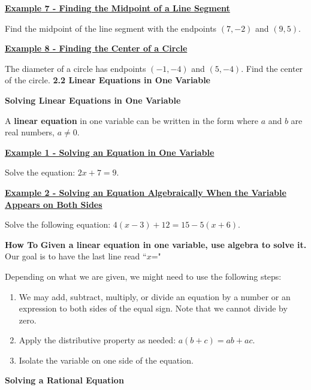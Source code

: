 \documentclass[12pt]{book}
\newcommand{\D}{\displaystyle}
\begin{document}
\newpage


\underline{\textbf{Example 7 - Finding the Midpoint of a Line Segment}}

Find the midpoint of the line segment with the endpoints $(7, -2)$ and $(9,5)$.


\vspace{70mm}
\underline{\textbf{Example 8 - Finding the Center of a Circle}}

The diameter of a circle has endpoints $(-1,-4)$ and $(5,-4)$. Find the center of the circle. 
\newpage
\textbf{{\Large 2.2 Linear Equations in One Variable}}
\vspace{5mm}


{\large \textbf{Solving Linear Equations in One Variable}}
\vspace{3mm}

A \textbf{linear equation} in one variable can be written in the form \underline{\hspace{25mm}} where $a$ and $b$ are real numbers, $a \neq 0$. 

\vspace{3mm}

\underline{\textbf{Example 1 - Solving an Equation in One Variable}}

\vspace{1mm}
Solve the equation: $\D 2x+7 = 9$.

\vspace{60mm}
\underline{\textbf{Example 2 - Solving an Equation Algebraically When the Variable Appears on Both Sides}}

\vspace{1mm}
Solve the following equation: $\D 4(x-3) + 12 = 15-5(x+6)$.


\newpage

\begin{boxR}
    \textbf{How To}
    \vspace{1mm}
    \hline
      \vspace{2mm}
   \textbf{Given a linear equation in one variable, use algebra to solve it.} Our goal is to have the last line read ``$x$\hspace{1mm}=\hspace{1mm}\underline{\hspace{10mm}}"

Depending on what we are given, we might need to use the following steps:
    \begin{enumerate}
     \item We may add, subtract, multiply, or divide an equation by a number or an expression to both sides of the equal sign. Note that we cannot divide by zero.
     \item Apply the distributive property as needed: $a(b+c)=ab+ac$.
     \item Isolate the variable on one side of the equation.
       \end{enumerate}
\end{boxR}
\vspace{3mm}
{\large \textbf{Solving a Rational Equation}}
\end{document}
